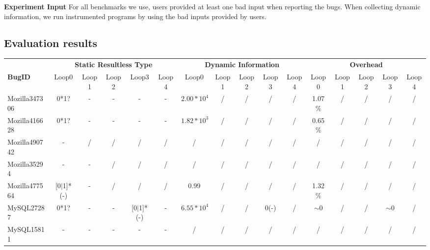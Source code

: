 {\bf Experiment Input} 
For all benchmarks we use, 
users provided at least one bad input when reporting the bugs. 
When collecting dynamic information, 
we run instrumented programs by using the bad inputs provided by users.  

\subsection{Evaluation results}

\begin{table*}
  \centering
  \tiny
  \newcommand{\Yes}[1]{\checkmark{}$_#1$}
  \newcommand{\No}[0]{-}
  \begin{tabular}{lccccccccccccccc}
    \toprule
              &  \multicolumn{5}{c}{\bf Static Resultless Type} & \multicolumn{5}{c}{\bf Dynamic Information} & \multicolumn{5}{c}{\bf Overhead}\\
\cmidrule(lr){2-6} \cmidrule(lr){7-11} \cmidrule(lr){12-16}
   {\bf BugID}      & Loop0 & Loop1 &  Loop2 &   Loop3 &   Loop4 & Loop0     &   Loop1 &   Loop2 &  Loop3 &   Loop4 &   Loop0 & Loop1 &   Loop2 &  Loop3 &  Loop4 \\
    \midrule
    Mozilla347306   & 0*1?          & \No   & \No    &   \No          & \No     & $2.00*10^4$ & /       & /       &  /     &  /      &   1.07\%   &   /   &   /     &  /      &  /\\
    Mozilla416628   & 0*1?          & \No   & \No    & \No            &   \No   & $1.82*10^3$ & /       & /       &  /     &  /      &   0.65\%   &   /   &   /     &  /       &  /\\
    Mozilla490742   & \No           & /     & /      & /              &   /     & /           & /       & /       &  /     &  /      &   /        &   /   &   /     &  /       &  /\\
    Mozilla35294    & \No           & \No   & /      & /              &   /     & /           & /       & /       &  /     &  /      &   /        &   /   &   /     &  /       &  /\\
    Mozilla477564   & [0$|$1]*(\No) & \No   & /      & /              &   /     & 0.99        & /       & /       &  /     &  /      &   1.32\%   &   /   &   /     &  /       &  /\\
    \midrule
    MySQL27287      & 0*1?          & \No   & \No    & [0$|$1]*(\No)   &   \No  & $6.55*10^4$ & /       & /        &  0(\No)  &  /         &  $\sim$0    &   /      &   /  &  $\sim$0 &  /\\
    MySQL15811      & \No           & \No   & \No    & \No      &   \No   & /        & /      & /       &  /       &  /       &   /      &   /      &   /      &  /       &  /\\

\end{tabular}
\end{table*}
